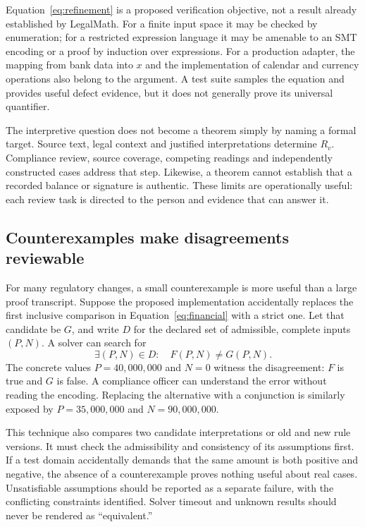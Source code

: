Equation~\eqref{eq:refinement} is a proposed verification objective, not a result
already established by LegalMath. For a finite input space it may be checked by
enumeration; for a restricted expression language it may be amenable to an SMT
encoding or a proof by induction over expressions. For a production adapter,
the mapping from bank data into $x$ and the implementation of calendar and
currency operations also belong to the argument. A test suite samples the
equation and provides useful defect evidence, but it does not generally prove its
universal quantifier.

The interpretive question does not become a theorem simply by naming a formal
target. Source text, legal context and justified interpretations determine
$R_v$. Compliance review, source coverage, competing readings and independently
constructed cases address that step. Likewise, a theorem cannot establish that
a recorded balance or signature is authentic. These limits are operationally
useful: each review task is directed to the person and evidence that can answer it.

\subsection{Counterexamples make disagreements reviewable}

For many regulatory changes, a small counterexample is more useful than a large
proof transcript. Suppose the proposed implementation accidentally replaces the
first inclusive comparison in Equation~\eqref{eq:financial} with a strict one.
Let that candidate be $G$, and write $D$ for the declared set of admissible,
complete inputs $(P,N)$. A solver can search for
\begin{equation}
 \exists (P,N)\in D:\quad F(P,N)\ne G(P,N).
 \label{eq:counterexample}
\end{equation}
The concrete values $P=40{,}000{,}000$ and $N=0$ witness the disagreement:
$F$ is true and $G$ is false. A compliance officer can understand the error
without reading the encoding. Replacing the alternative with a conjunction is
similarly exposed by $P=35{,}000{,}000$ and $N=90{,}000{,}000$.

This technique also compares two candidate interpretations or old and new rule
versions. It must check the admissibility and consistency of its assumptions
first. If a test domain accidentally demands that the same amount is both
positive and negative, the absence of a counterexample proves nothing useful
about real cases. Unsatisfiable assumptions should be reported as a separate
failure, with the conflicting constraints identified. Solver timeout and unknown
results should never be rendered as ``equivalent.''

